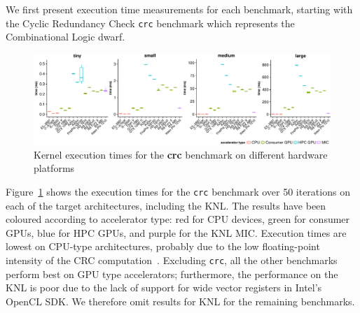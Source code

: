 \documentclass[../document.tex]{subfiles}
\begin{document}
\label{ssec:time}
	
We first present execution time measurements for each benchmark, starting with the Cyclic Redundancy Check {\tt crc} benchmark which represents the Combinational Logic dwarf.

\newcommand{\plotwidth}{0.24\textwidth}

\begin{figure}[t]
	\centering
	\includegraphics[width=\textwidth,keepaspectratio]{figures/new-time-results/generate_crc_row_bandwplot}
	\caption{Kernel execution times for the {\bf crc} benchmark on different hardware platforms}
	\label{fig:time-crc}
\end{figure}



Figure~\ref{fig:time-crc} shows the execution times for the {\tt crc} benchmark over 50 iterations on each of the target architectures, including the KNL.
The results have been coloured according to accelerator type: red for CPU devices, green for consumer GPUs, blue for HPC GPUs, and purple for the KNL MIC.
Execution times are lowest on CPU-type architectures, probably due to the low floating-point intensity of the CRC computation~\cite[Ch. 6]{joshi2016thesis}.
Excluding {\tt crc}, all the other benchmarks perform best on GPU type accelerators; furthermore, the performance on the KNL is poor due to the lack of support for wide vector registers in Intel's OpenCL SDK.
We therefore omit results for KNL for the remaining benchmarks.

\end{document}
